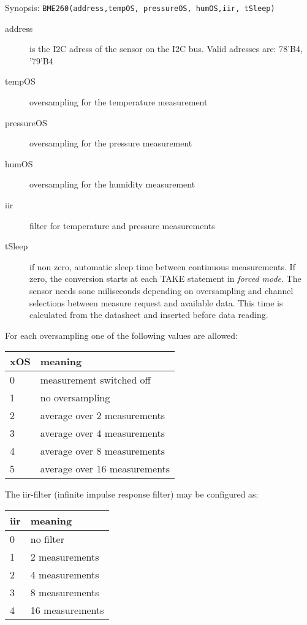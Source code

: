 Synopsis: \texttt{BME260(address,tempOS, pressureOS, humOS,iir, tSleep)}

\begin{description}
\item[address] is the I2C adress of the sensor on the I2C bus.
   Valid adresses are: 78'B4, '79'B4
\item[tempOS] oversampling for the temperature measurement
\item[pressureOS] oversampling for the pressure measurement
\item[humOS] oversampling for the humidity measurement
\item[iir] filter for temperature and pressure measurements
\item [tSleep] if non zero, automatic sleep time between
 continuous measurements. 
If zero, the conversion starts at each TAKE  statement
 in \textit{forced mode}. The sensor needs sone miliseconds depending
on oversampling and channel selections between measure
 request and available data. This time is calculated from the
  datasheet and inserted before data reading.
\end{description}
For each oversampling one of the following values are allowed:

\begin{tabular}{|l|l|}
\hline
xOS & meaning \\
\hline
0 & measurement switched off\\
1 & no oversampling \\
2 & average over 2 measurements \\
3 & average over 4 measurements \\
4 & average over 8 measurements \\
5 & average over 16 measurements \\
\hline
\end{tabular}

The iir-filter (infinite impulse response filter) may be configured as:

\begin{tabular}{|l|l|}
\hline
iir & meaning \\
\hline
0 & no filter \\
1 & 2 measurements \\
2 & 4 measurements \\
3 & 8 measurements \\
4 & 16 measurements \\
\hline
\end{tabular}

